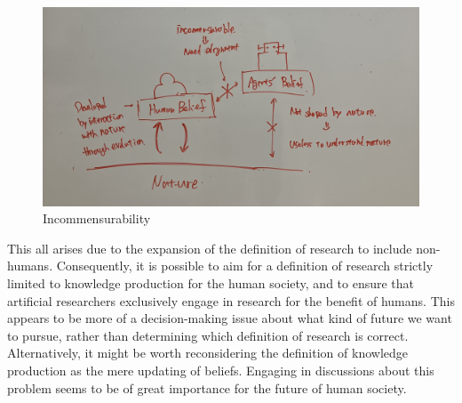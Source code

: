 \begin{figure}[htb]
    \centering
    \includegraphics[width=\linewidth]{figs/incommensurability.jpg}
    \caption{Incommensurability}
    \label{fig:incommensurability}
\end{figure}

This all arises due to the expansion of the definition of research to include non-humans. Consequently, it is possible to aim for a definition of research strictly limited to knowledge production for the human society, and to ensure that artificial researchers exclusively engage in research for the benefit of humans. This appears to be more of a decision-making issue about what kind of future we want to pursue, rather than determining which definition of research is correct. Alternatively, it might be worth reconsidering the definition of knowledge production as the mere updating of beliefs. Engaging in discussions about this problem seems to be of great importance for the future of human society.


